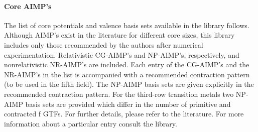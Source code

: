 \paragraph{Core AIMP's}
\label{UG:sec:core_aimps}
 
   The list of core potentials and valence basis sets
available in the  library follows.
Although AIMP's exist in the literature for different core
sizes, this library includes only those recommended by
the authors after numerical experimentation.
Relativistic CG-AIMP's and NP-AIMP's, respectively, and nonrelativistic NR-AIMP's are included.
Each entry of the CG-AIMP's and the NR-AIMP's in the list is accompanied with a recommended contraction pattern 
(to be used in the fifth field).
The NP-AIMP basis sets are given explicitly in the recommended contraction pattern.
For the third-row transition metals two NP-AIMP basis sets are provided which differ
in the number of primitive and contracted f GTFs. For further details, please refer to
the literature.\cite{Rakowitz:99b}
For more information about a particular entry consult the  library.
 
 
